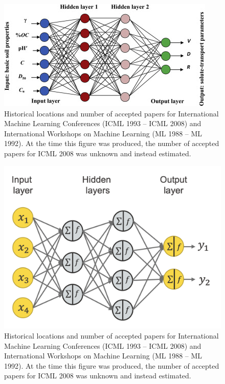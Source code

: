     \begin{figure}[ht]
        \vskip 0.2in
        \begin{center}
            \centerline{\includegraphics[width=\columnwidth]{../figures/NN.jpg}}
            \caption{Historical locations and number of accepted papers for International
            Machine Learning Conferences (ICML 1993 -- ICML 2008) and International
            Workshops on Machine Learning (ML 1988 -- ML 1992). At the time this figure was
            produced, the number of accepted papers for ICML 2008 was unknown and instead
            estimated.}
            \label{icml-historical}
        \end{center}
        \vskip -0.2in
    \end{figure}

    \begin{figure}[ht]
        \vskip 0.2in
        \begin{center}
            \centerline{\includegraphics[width=\columnwidth]{../figures/NN2.png}}
            \caption{Historical locations and number of accepted papers for International
            Machine Learning Conferences (ICML 1993 -- ICML 2008) and International
            Workshops on Machine Learning (ML 1988 -- ML 1992). At the time this figure was
            produced, the number of accepted papers for ICML 2008 was unknown and instead
            estimated.}
            \label{icml-historical2}
        \end{center}
        \vskip -0.2in
    \end{figure}


